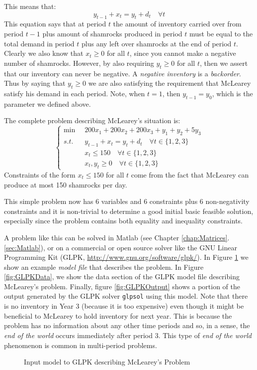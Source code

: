 \begin{example}
This means that:
\begin{equation}
y_{t-1} + x_t = y_{t} + d_t\quad\forall t
\end{equation}
This equation says that at period $t$ the amount of inventory carried over from period $t-1$ plus amount of shamrocks produced in period $t$ must be equal to the total demand in period $t$ plus any left over shamrocks at the end of period $t$. Clearly we also know that $x_t \geq 0$ for all $t$, since you cannot make a negative number of shamrocks. However, by also requiring $y_t \geq 0$ for all $t$, then we assert that our inventory can never be negative. A \textit{negative inventory} is a \textit{backorder}. Thus by saying that $y_t \geq 0$ we are also satisfying the requirement that McLearey satisfy his demand in each period. Note, when $t = 1$, then $y_{t-1} = y_0$, which is the parameter we defined above.

The complete problem describing McLearey's situation is:
\begin{equation}
\left\{
\begin{aligned}
\min\;\;&200x_1 + 200x_2 + 200x_3 + y_1 + y_2 + 5y_3\\
s.t.\;\;&y_{t-1} + x_t = y_{t} + d_t\quad\forall t \in \{1,2,3\}\\
&x_t \leq 150\quad\forall t \in \{1,2,3\}\\
&x_t,y_t \geq 0\quad\forall t \in \{1,2,3\}
\end{aligned}\right.
\end{equation}
Constraints of the form $x_t \leq 150$ for all $t$ come from the fact that McLearey can produce at most 150 shamrocks per day.

This simple problem now has 6 variables and 6 constraints plus 6 non-negativity constraints and it is non-trivial to determine a good initial basic feasible solution, especially since the problem contains both equality and inequality constraints. 

A problem like this can be solved in Matlab (see Chapter \ref{chap:Matrices}.\ref{sec:Matlab}), or on a commercial or open source solver like the GNU Linear Programming Kit (GLPK, \url{http://www.gnu.org/software/glpk/}). In Figure \ref{fig:GLPKModel} we show an example \textit{model file} that describes the problem. In Figure \ref{fig:GLPKData}, we show the data section of the GLPK model file describing McLearey's problem. Finally, figure \ref{fig:GLPKOutput} shows a portion of the output generated by the GLPK solver \texttt{glpsol} using this model. Note that there is no inventory in Year 3 (because it is too expensive) even though it might be beneficial to McLearey to hold inventory for next year. This is because the problem has no information about any other time periods and so, in a sense, the \textit{end of the world} occurs immediately after period 3. This type of \textit{end of the world} phenomenon is common in multi-period problems.
\begin{figure}[htbp]
\scriptsize

\caption{Input model to GLPK describing McLearey's Problem}
\label{fig:GLPKModel}
\normalsize
\end{figure}


\end{example}
